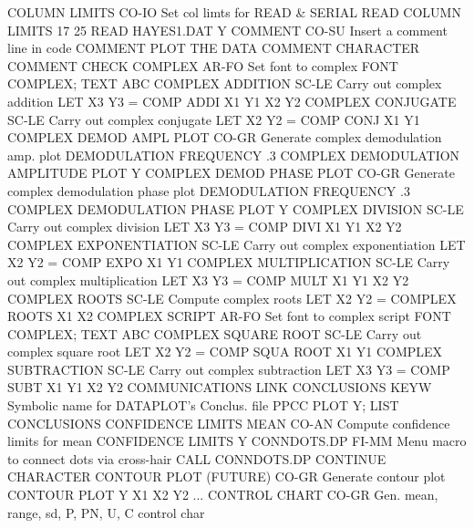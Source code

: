 COLUMN LIMITS               CO-IO Set col limts for READ & SERIAL READ
                                  COLUMN LIMITS 17 25
                                  READ HAYES1.DAT Y
COMMENT                     CO-SU Insert a comment line in code
                                  COMMENT PLOT THE DATA
COMMENT CHARACTER
COMMENT CHECK
COMPLEX                     AR-FO Set font to complex
                                  FONT COMPLEX; TEXT ABC
COMPLEX ADDITION            SC-LE Carry out complex addition
                                  LET X3 Y3 = COMP ADDI X1 Y1 X2 Y2
COMPLEX CONJUGATE           SC-LE Carry out complex conjugate
                                  LET X2 Y2 = COMP CONJ X1 Y1
COMPLEX DEMOD AMPL PLOT     CO-GR Generate complex demodulation amp. plot
                                  DEMODULATION FREQUENCY .3
                                  COMPLEX DEMODULATION AMPLITUDE PLOT Y
COMPLEX DEMOD PHASE PLOT    CO-GR Generate complex demodulation phase plot
                                  DEMODULATION FREQUENCY .3
                                  COMPLEX DEMODULATION PHASE PLOT Y
COMPLEX DIVISION            SC-LE Carry out complex division
                                  LET X3 Y3 = COMP DIVI X1 Y1 X2 Y2
COMPLEX EXPONENTIATION      SC-LE Carry out complex exponentiation
                                  LET X2 Y2 = COMP EXPO X1 Y1
COMPLEX MULTIPLICATION      SC-LE Carry out complex multiplication
                                  LET X3 Y3 = COMP MULT X1 Y1 X2 Y2
COMPLEX ROOTS               SC-LE Compute complex roots
                                  LET X2 Y2 = COMPLEX ROOTS X1 X2
COMPLEX SCRIPT              AR-FO Set font to complex script
                                  FONT COMPLEX; TEXT ABC
COMPLEX SQUARE ROOT         SC-LE Carry out complex square root
                                  LET X2 Y2 = COMP SQUA ROOT X1 Y1
COMPLEX SUBTRACTION         SC-LE Carry out complex subtraction
                                  LET X3 Y3 = COMP SUBT X1 Y1 X2 Y2
COMMUNICATIONS LINK
CONCLUSIONS                 KEYW  Symbolic name for DATAPLOT's Conclus. file
                                  PPCC PLOT Y; LIST CONCLUSIONS
CONFIDENCE LIMITS MEAN      CO-AN Compute confidence limits for mean
                                  CONFIDENCE LIMITS Y
CONNDOTS.DP                 FI-MM Menu macro to connect dots via cross-hair
                                  CALL CONNDOTS.DP
CONTINUE CHARACTER
CONTOUR PLOT   (FUTURE)     CO-GR Generate contour plot
                                  CONTOUR PLOT Y X1 X2   Y2
... CONTROL CHART           CO-GR Gen. mean, range, sd, P, PN, U, C control char
